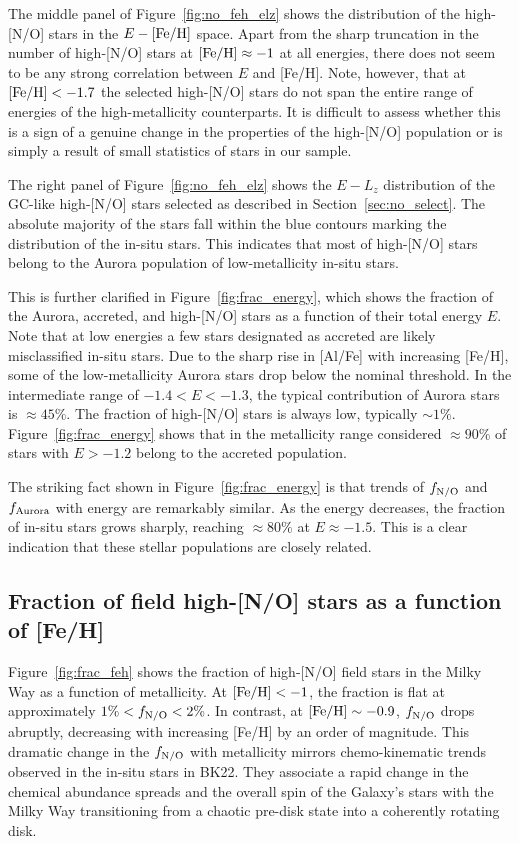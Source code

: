 \documentclass[a4paper,useAMS,usenatbib]{mnras}
\begin{document}
The middle panel of Figure~\ref{fig:no_feh_elz} shows the distribution of the high-[N/O] stars in the $E-\rm [Fe/H]$ space. Apart from the sharp truncation in the number of high-[N/O] stars at $\rm [Fe/H]\approx-1$ at all energies, there does not seem to be any strong correlation between $E$ and [Fe/H]. Note, however, that at $\rm [Fe/H]<-1.7$ the selected high-[N/O] stars do not span the entire range of energies of the high-metallicity counterparts. It is difficult to assess whether this is a sign of a genuine change in the properties of the high-[N/O] population or is simply a result of small statistics of stars in our sample.

The right panel of Figure~\ref{fig:no_feh_elz} shows the $E-L_z$ distribution of the GC-like high-[N/O] stars selected as described in Section~\ref{sec:no_select}. The absolute majority of the stars fall within the blue contours marking the distribution of the in-situ stars.
This indicates that most of high-[N/O] stars belong to the Aurora population of low-metallicity in-situ stars. 

This is further clarified in Figure~\ref{fig:frac_energy}, which shows the fraction of the Aurora, accreted, and high-[N/O] stars as a function of their total energy $E$. Note that at low energies a few stars designated as accreted are likely misclassified in-situ stars. Due to the sharp rise in [Al/Fe] with increasing [Fe/H], some of the low-metallicity Aurora stars drop below the nominal threshold.  
In the intermediate range of $-1.4<E<-1.3$, the typical contribution of Aurora stars is $\approx 45\%$. The fraction of high-[N/O] stars is always low, typically $\sim1\%$. Figure~\ref{fig:frac_energy} shows that in the metallicity range considered $\approx 90\%$ of stars with $E>-1.2$ belong to the accreted population. 

The striking fact shown in Figure~\ref{fig:frac_energy} is that trends of $f_{\rm N/O}$ and $f_{\rm Aurora}$ with energy are remarkably similar. As the energy decreases, the fraction of in-situ stars grows sharply, reaching $\approx 80\%$ at $E\approx-1.5$. This is a clear indication that these stellar populations are closely related. 

\subsection{Fraction of field high-[N/O] stars as a function of [Fe/H]}
\label{sec:frac_feh}

Figure~\ref{fig:frac_feh} shows  the fraction of high-[N/O] field stars in the Milky Way as a function of metallicity. At $\rm [Fe/H]<-1$, the fraction is flat at approximately $1\%<f_{\rm N/O}<2\%$. In contrast, at $\rm[Fe/H]\sim-0.9$, $f_{\rm N/O}$ drops abruptly, decreasing with increasing [Fe/H] by an order of magnitude. This dramatic change in the $f_{\rm N/O}$ with metallicity mirrors chemo-kinematic trends observed in the in-situ stars in BK22. They associate a rapid change in the chemical abundance spreads and the overall spin of the Galaxy's stars with the Milky Way transitioning from a chaotic pre-disk state into a coherently rotating disk. 
\end{document}
